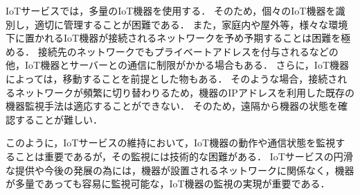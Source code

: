 IoTサービスでは，多量のIoT機器を使用する．
そのため，個々のIoT機器を識別し，適切に管理することが困難である．
また，家庭内や屋外等，様々な環境下に置かれるIoT機器が接続されるネットワークを予め予期することは困難を極める．
接続先のネットワークでもプライベートアドレスを付与されるなどの他，IoT機器とサーバーとの通信に制限がかかる場合もある．
さらに，IoT機器によっては，移動することを前提とした物もある．
そのような場合，接続されるネットワークが頻繁に切り替わりるため，機器のIPアドレスを利用した既存の機器監視手法は適応することができない．
そのため，遠隔から機器の状態を確認することが難しい．
\medskip

このように，IoTサービスの維持において，IoT機器の動作や通信状態を監視することは重要であるが，その監視には技術的な困難がある．
IoTサービスの円滑な提供や今後の発展の為には，機器が設置されるネットワークに関係なく，機器が多量であっても容易に監視可能な，IoT機器の監視の実現が重要である．
\medskip

